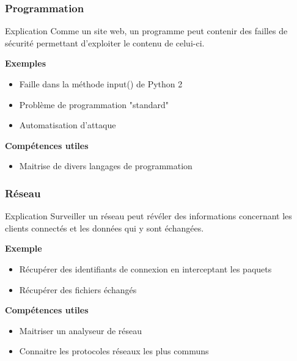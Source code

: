 \documentclass{beamer}
\begin{document}

\begin{frame}
\frametitle{Programmation}

\begin{block}{Explication}
    Comme un site web, un programme peut contenir des failles de sécurité permettant d'exploiter le contenu de celui-ci.
\end{block}

\pause

\textbf{Exemples}
\begin{itemize}
    \item Faille dans la méthode input() de Python 2
    \item Problème de programmation "standard"
    \item Automatisation d'attaque
\end{itemize}

\pause

\textbf{Compétences utiles}
\begin{itemize}
    \item Maitrise de divers langages de programmation
\end{itemize}


\end{frame}


\begin{frame}
\frametitle{Réseau}

\begin{block}{Explication}
    Surveiller un réseau peut révéler des informations concernant les clients connectés et les données qui y sont échangées.
\end{block}

\pause

\textbf{Exemple}
\begin{itemize}
    \item Récupérer des identifiants de connexion en interceptant les paquets
    \item Récupérer des fichiers échangés
\end{itemize}

\pause

\textbf{Compétences utiles}
\begin{itemize}
    \item Maitriser un analyseur de réseau
    \item Connaitre les protocoles réseaux les plus communs
\end{itemize}


\end{frame}
\end{document}
